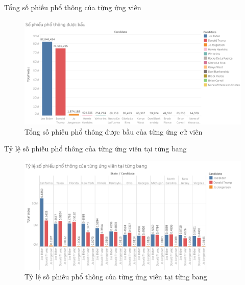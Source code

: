 \documentclass[10pt]{beamer}
\theoremstyle{remark}
\theoremstyle{definition}
\begin{document}
\begin{frame}{Tổng số phiếu phổ thông của từng ứng viên}
	\begin{figure}[h!]
        \centering
        \includegraphics[width=\textwidth]{Total_Popular_Votes_Candidates_Bar_Chart.png}
        \caption{Tổng số phiếu phổ thông được bầu của từng ứng cử viên}
    \end{figure}
\end{frame}

\begin{frame}{Tỷ lệ số phiếu phổ thông của từng ứng viên tại từng bang}
	\begin{figure}[h!]
        \centering
        \includegraphics[width=\textwidth]{Percentage_Popular_Votes_Candidates_by_States.png}
        \caption{Tỷ lệ số phiếu phổ thông của từng ứng viên tại từng bang}
    \end{figure}
\end{frame}
\end{document}
